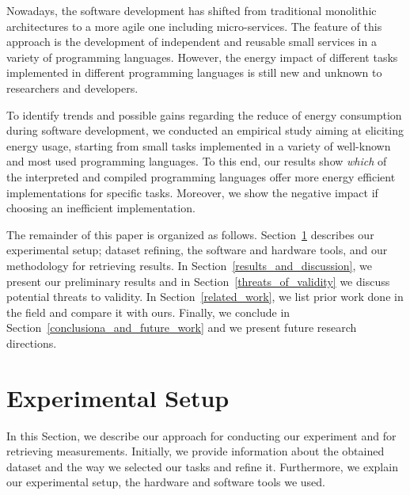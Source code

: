 Nowadays, the software development has shifted from traditional 
monolithic architectures to a more agile one including micro-services. 
The feature of this approach is the development of independent and 
reusable small services in a variety of programming languages.
However, the energy impact of different tasks implemented in different 
programming languages is still new and unknown to researchers and
developers.


To identify trends and possible gains regarding the reduce of energy 
consumption during software development, we conducted an empirical 
study aiming at eliciting energy usage, starting from small 
tasks implemented in a variety of well-known and most used 
programming languages. 
To this end, our results show \textit{which} of the interpreted and 
compiled programming languages offer more energy efficient implementations 
for specific tasks. 
Moreover, we show the negative impact if choosing an inefficient implementation.


The remainder of this paper is organized as follows.
Section~\ref{experiment_setup} describes our experimental 
setup; dataset refining, the software and hardware 
tools, and our methodology for retrieving results. 
In Section~\ref{results_and_discussion}, we present our preliminary 
results and in Section~\ref{threats_of_validity} we discuss 
potential threats to validity.
In Section~\ref{related_work}, we list prior work done in the 
field and compare it with ours.
Finally, we conclude in Section~\ref{conclusiona_and_future_work} 
and we present future research directions.

\section{Experimental Setup} \label{experiment_setup}
In this Section, we describe our approach for conducting  
our experiment and for retrieving measurements. 
Initially, we provide information about the obtained dataset 
and the way we selected our tasks and refine it. 
Furthermore, we explain our experimental setup, the hardware and 
software tools we used. 

